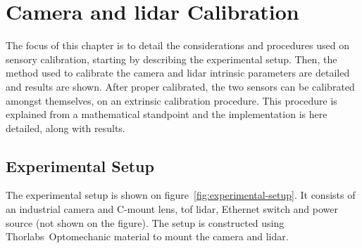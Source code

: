 \chapter{Camera and \acs{lidar} Calibration}
\label{chapter:calibration}

The focus of this chapter is to detail the considerations and procedures used on sensory calibration, starting by describing the experimental setup. Then, the method used to calibrate the camera and \ac{lidar} intrinsic parameters are detailed and results are shown. After proper calibrated, the two sensors can be calibrated amongst themselves, on an extrinsic calibration procedure. This procedure is explained from a mathematical standpoint and the implementation is here detailed, along with results.


\section{Experimental Setup}
\label{sec:calibration:experimental-setup}
The experimental setup is shown on figure~\ref{fig:experimental-setup}. It consists of an industrial camera and C-mount lens, \ac{tof} \ac{lidar}, Ethernet switch and power source (not shown on the figure). The setup is constructed using Thorlabs\cp~Optomechanic material to mount the camera and \ac{lidar}.

